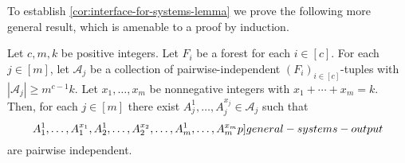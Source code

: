 \documentclass{patmorin}
\newcommand{\pat}[1]{\textcolor{Blue}{[Pat: #1]}}
\newcommand{\piotr}[1]{\textcolor{red}{Piotr: #1}}
\begin{document}
To establish \cref{cor:interface-for-systems-lemma} we prove the following more general result, which is amenable to a proof by induction.


\begin{lem}\label{cor:general-systems-lemma}
Let $c,m,k$ be positive integers.
Let $F_i$ be a forest for each $i\in[c]$.
For each $j\in [m]$,
let $\mathcal{A}_j$ be a collection of pairwise-independent $(F_i)_{i\in[c]}$-tuples with $|\mathcal{A}_j|\geq m^{c-1}k$.
Let $x_1,\ldots,x_m$ be nonnegative integers with $x_1+\cdots+x_m=k$.
Then, for each $j\in[m]$ there exist
$A_j^{1},\ldots,A_j^{x_j}\in \mathcal{A}_j$ such that
\begin{equation}
A_1^{1},\ldots,A_1^{x_1},A_2^{1},\ldots,A_2^{x_2},\ldots,A_m^{1},\ldots,A_m^{x_m}  \label[p]{general-systems-output}
\end{equation}
are pairwise independent.
\end{lem}
\end{document}
